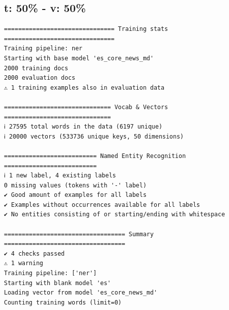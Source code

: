 \documentclass[12pt,a4paper,]{scrartcl}
\begin{document}
\hypertarget{t-50---v-50}{%
\subsection{t: 50\% - v: 50\%}\label{t-50---v-50}}

\begin{verbatim}
=============================== Training stats ===============================
Training pipeline: ner
Starting with base model 'es_core_news_md'
2000 training docs
2000 evaluation docs
⚠ 1 training examples also in evaluation data

============================== Vocab & Vectors ==============================
ℹ 27595 total words in the data (6197 unique)
ℹ 20000 vectors (533736 unique keys, 50 dimensions)

========================== Named Entity Recognition ==========================
ℹ 1 new label, 4 existing labels
0 missing values (tokens with '-' label)
✔ Good amount of examples for all labels
✔ Examples without occurrences available for all labels
✔ No entities consisting of or starting/ending with whitespace

================================== Summary ==================================
✔ 4 checks passed
⚠ 1 warning
Training pipeline: ['ner']
Starting with blank model 'es'
Loading vector from model 'es_core_news_md'
Counting training words (limit=0)
\end{verbatim}
\end{document}

